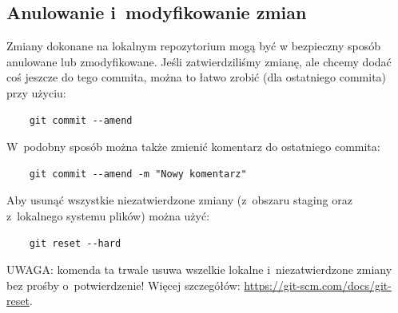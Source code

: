 \documentclass[12pt]{article}
\begin{document}
        \subsection*{Anulowanie i~modyfikowanie zmian}
        Zmiany dokonane na lokalnym repozytorium mogą być w bezpieczny sposób anulowane lub zmodyfikowane. Jeśli zatwierdziliśmy zmianę, ale chcemy dodać coś jeszcze do tego commita, można to łatwo zrobić (dla ostatniego commita) przy użyciu:
        \begin{verbatim}
    git commit --amend
        \end{verbatim}
        W~podobny sposób można także zmienić komentarz do ostatniego commita:
        \begin{verbatim}
    git commit --amend -m "Nowy komentarz"
        \end{verbatim}
        Aby usunąć wszystkie niezatwierdzone zmiany (z~obszaru staging oraz z~lokalnego systemu plików) można użyć:
        \begin{verbatim}
    git reset --hard
        \end{verbatim}
        UWAGA: komenda ta trwale usuwa wszelkie lokalne i~niezatwierdzone zmiany bez prośby o~potwierdzenie! Więcej szczegółów: \url{https://git-scm.com/docs/git-reset}.
\end{document}
